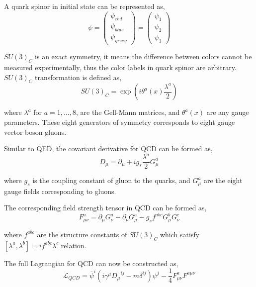 A quark spinor in initial state can be represented as,
%
\begin{equation}
  \psi = \left( \begin{matrix}
    \psi_{red}  \\
    \psi_{blue} \\
    \psi_{green}
  \end{matrix} \right)
  = \left( \begin{matrix}
    \psi_{1} \\
    \psi_{2} \\
    \psi_{3}
  \end{matrix} \right)
\end{equation}

\( {SU(3)}_{C} \) is an exact symmetry, it means the difference between
colors cannot be measured experimentally, thus the color labels in quark spinor are arbitrary.
\( {SU(3)}_{C} \) transformation is defined as,
%
\begin{equation}
  {SU(3)}_{C} = \exp \left( {i \theta^{a}(x) \frac{\lambda^{a}}{2}} \right)
\end{equation}

where \( \lambda^{a} \) for \( a = 1,\ldots,8\),
are the Gell-Mann matrices, and \( \theta^{a}(x) \) are any gauge parameters.
These eight generators of symmetry corresponds to eight gauge vector boson gluons.

Similar to \gls{QED}, the covariant derivative for \gls{QCD} can be formed as,
%
\begin{equation}
  D_{\mu} = \partial_{\mu} + i g_s \frac{\lambda^{a}}{2} G_{\mu}^{a}
\end{equation}

where \( g_s \) is the coupling constant of gluon to the quarks,
and \( G_{\mu}^{a} \) are the eight gauge fields corresponding to gluons.

The corresponding field strength tensor in \gls{QCD} can be formed as,
%
\begin{equation}
  F_{\mu \nu}^{a} = \partial_{\mu} G_{\nu}^{a} - \partial_{\nu} G_{\mu}^{a}
  - g_s f^{abc} G_{\mu}^{b} G_{\nu}^{c}
\end{equation}

where \( f^{abc} \) are the structure constants of \( {SU(3)}_{C} \)
which satisfy \( [\lambda^{a}, \lambda^{b}] = i f^{abc} \lambda^{c} \) relation.

The full Lagrangian for \gls{QCD} can now be constructed as,
%
\begin{equation}
  {\mathcal{L}}_{QCD} = {\bar{\psi}}^{i}
  ( i {\gamma}^{\mu} {{D}_{\mu}}^{ij} - m \delta^{ij} )\psi^{j}
  - \frac{1}{4} {F}_{\mu \nu}^{a} {F}^{a \mu \nu}
\end{equation}


